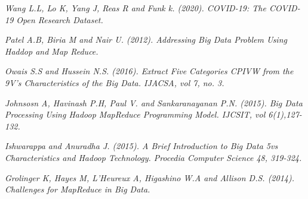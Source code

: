 \documentclass[conference]{IEEEtran}
\begin{document}
\begin{thebibliography}{9}

\textit{Wang L.L, Lo K, Yang J, Reas R and Funk k. (2020). COVID-19: The COVID-19 Open Research Dataset.}

\textit{Patel A.B, Biria M and Nair U. (2012). Addressing Big Data Problem Using Haddop and Map Reduce.}

\textit{Owais S.S and Hussein N.S. (2016). Extract Five Categories CPIVW from the 9V's Characteristics of the Big Data. IJACSA, vol 7, no. 3.}

\textit{Johnsosn A, Havinash P.H, Paul V. and Sankaranayanan P.N. (2015). Big Data Processing Using Hadoop MapReduce Programming Model. IJCSIT, vol 6(1),127-132.}

\textit{Ishwarappa and Anuradha J. (2015). A Brief Introduction to Big Data 5vs Characteristics and Hadoop Technology. Procedia Computer Science 48, 319-324.}

\textit{Grolinger K, Hayes M, L'Heureux A, Higashino W.A and Allison D.S. (2014). Challenges for MapReduce in Big Data.}
\end{thebibliography}
\end{document}
